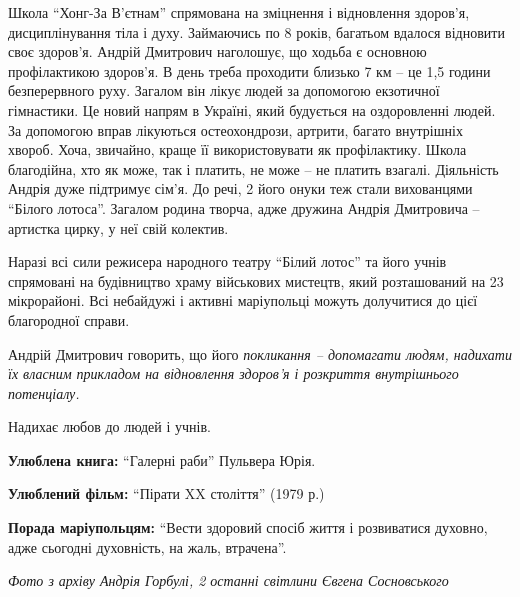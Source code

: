 Школа \enquote{Хонг-За В'єтнам} спрямована на зміцнення і відновлення здоров'я,
дисциплінування тіла і духу. Займаючись по 8 років, багатьом вдалося відновити
своє здоров'я. Андрій Дмитрович наголошує, що ходьба є основною профілактикою
здоров'я. В день треба проходити близько 7 км – це 1,5 години безперервного
руху. Загалом він лікує людей за допомогою екзотичної гімнастики. Це новий
напрям в Україні, який будується на оздоровленні людей. За допомогою вправ
лікуються остеохондрози, артрити, багато внутрішніх хвороб. Хоча, звичайно,
краще її використовувати як профілактику. Школа благодійна, хто як може, так і
платить, не може – не платить взагалі. Діяльність Андрія дуже підтримує сім'я.
До речі, 2 його онуки теж стали вихованцями \enquote{Білого лотоса}. Загалом родина
творча, адже дружина Андрія Дмитровича – артистка цирку, у неї свій колектив.


Наразі всі сили режисера народного театру \enquote{Білий лотос} та його учнів
спрямовані на будівництво храму військових мистецтв, який розташований на 23
мікрорайоні. Всі небайдужі і активні маріупольці можуть долучитися до цієї
благородної справи.

Андрій Дмитрович говорить, що його \emph{покликання – допомагати людям, надихати їх
власним прикладом на відновлення здоров'я і розкриття внутрішнього потенціалу.} 

Надихає любов до людей і учнів.


\textbf{Улюблена книга:} \enquote{Галерні раби} Пульвера Юрія.

\textbf{Улюблений фільм:} \enquote{Пірати XX століття} (1979 р.)

\textbf{Порада маріупольцям:} \enquote{Вести здоровий спосіб життя і розвиватися духовно, адже сьогодні духовність, на жаль, втрачена}.


\emph{Фото з архіву Андрія Горбулі, 2 останні світлини Євгена Сосновського}
